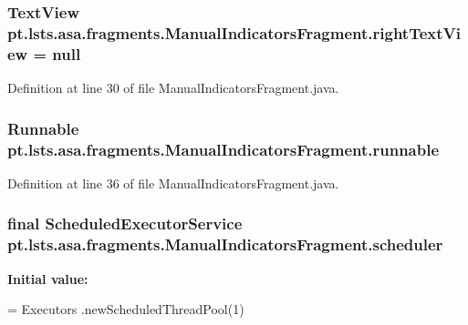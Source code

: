 \subsubsection[{right\+Text\+View}]{\setlength{\rightskip}{0pt plus 5cm}Text\+View pt.\+lsts.\+asa.\+fragments.\+Manual\+Indicators\+Fragment.\+right\+Text\+View = null\hspace{0.3cm}{\ttfamily [private]}}\label{classpt_1_1lsts_1_1asa_1_1fragments_1_1ManualIndicatorsFragment_a9324b8eea06f2500223307a43d7ddcfc}


Definition at line 30 of file Manual\+Indicators\+Fragment.\+java.

\hypertarget{classpt_1_1lsts_1_1asa_1_1fragments_1_1ManualIndicatorsFragment_a6d03a45c42d82392c0cd605bc0d1ccb8}{}
\subsubsection[{runnable}]{\setlength{\rightskip}{0pt plus 5cm}Runnable pt.\+lsts.\+asa.\+fragments.\+Manual\+Indicators\+Fragment.\+runnable\hspace{0.3cm}{\ttfamily [private]}}\label{classpt_1_1lsts_1_1asa_1_1fragments_1_1ManualIndicatorsFragment_a6d03a45c42d82392c0cd605bc0d1ccb8}


Definition at line 36 of file Manual\+Indicators\+Fragment.\+java.

\hypertarget{classpt_1_1lsts_1_1asa_1_1fragments_1_1ManualIndicatorsFragment_a6f5dc4f7db203a60ff03112379b4fc10}{}
\subsubsection[{scheduler}]{\setlength{\rightskip}{0pt plus 5cm}final Scheduled\+Executor\+Service pt.\+lsts.\+asa.\+fragments.\+Manual\+Indicators\+Fragment.\+scheduler\hspace{0.3cm}{\ttfamily [private]}}\label{classpt_1_1lsts_1_1asa_1_1fragments_1_1ManualIndicatorsFragment_a6f5dc4f7db203a60ff03112379b4fc10}
{\bfseries Initial value\+:}
\begin{DoxyCode}
= Executors
            .newScheduledThreadPool(1)
\end{DoxyCode}


